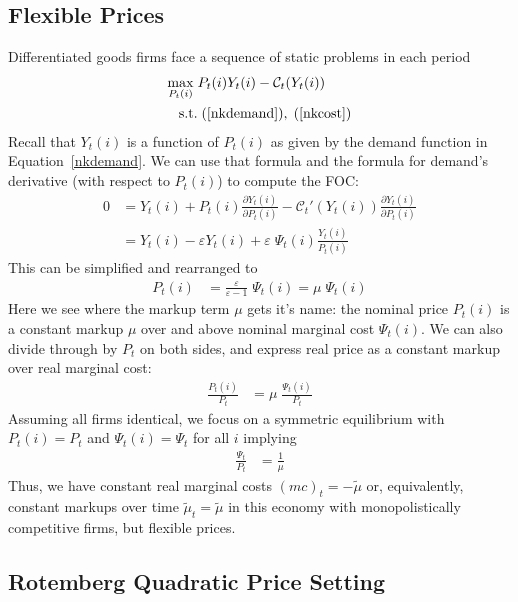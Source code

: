 \documentclass[12pt]{article}
\theoremstyle{plain}
\theoremstyle{definition}
\theoremstyle{remark}
\newcommand{\calC}{\mathcal{C}}
\begin{document}
\clearpage
\subsection{Flexible Prices}

Differentiated goods firms face a sequence of static problems in each
period
\begin{align*}
  \max_{P_t(i)}
  \;&P_t(i)Y_t(i) - \calC_t(Y_t(i)) \\
  \text{s.t.}&\; (\ref{nkdemand})
  ,\;(\ref{nkcost})
\end{align*}
Recall that $Y_t(i)$ is a function of $P_t(i)$ as given by the
demand function in Equation~\ref{nkdemand}. We can use that formula
and the formula for demand's derivative (with respect to $P_t(i)$)
to compute the FOC:
\begin{align*}
  0 &=
  Y_t(i)
  + P_t(i)\frac{\partial Y_t(i)}{\partial P_t(i)}
  - \calC_t'(Y_t(i))\frac{\partial Y_t(i)}{\partial P_t(i)}
  \\
  &=
  Y_t(i)
  - \varepsilon Y_t(i)
  + \varepsilon\;
  \Psi_t(i)
  \frac{Y_t(i)}{P_t(i)}
\end{align*}
This can be simplified and rearranged to
\begin{align*}
  P_t(i)
  &=
  \frac{\varepsilon}{\varepsilon-1}
  \;
  \Psi_t(i)
  =
  \mu\;
  \Psi_t(i)
\end{align*}
Here we see where the markup term $\mu$ gets it's name: the nominal
price $P_t(i)$ is a constant markup $\mu$ over and above nominal
marginal cost $\Psi_t(i)$. We can also divide through by
$P_t$ on both sides, and express real price as a constant markup
over real marginal cost:
\begin{align*}
  \frac{P_t(i)}{P_t}
  &=
  \mu\;
  \frac{\Psi_t(i)}{P_t}
\end{align*}
Assuming all firms identical, we focus on a symmetric equilibrium
with $P_t(i)=P_t$ and $\Psi_t(i)=\Psi_t$ for all $i$ implying
\begin{align*}
  \frac{\Psi_t}{P_t}
  &=
  \frac{1}{\mu}
\end{align*}
Thus, we have constant real marginal costs $(mc)_t=-\tilde{\mu}$ or,
equivalently, constant markups over time $\tilde{\mu}_t=\tilde{\mu}$
in this economy with monopolistically competitive firms, but flexible
prices.



\clearpage
\subsection{Rotemberg Quadratic Price Setting}
\end{document}
